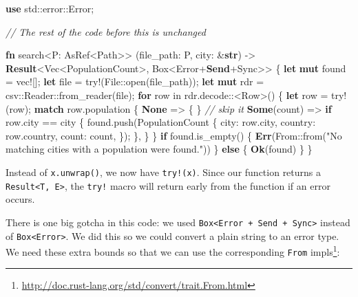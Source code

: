 \documentclass[a4paper,]{book}
\newenvironment{Shaded}{\begin{snugshade}}{\end{snugshade}}
\newcommand{\KeywordTok}[1]{\textcolor[rgb]{0.13,0.29,0.53}{\textbf{{#1}}}}
\newcommand{\StringTok}[1]{\textcolor[rgb]{0.31,0.60,0.02}{{#1}}}
\newcommand{\CommentTok}[1]{\textcolor[rgb]{0.56,0.35,0.01}{\textit{{#1}}}}
\newcommand{\OtherTok}[1]{\textcolor[rgb]{0.56,0.35,0.01}{{#1}}}
\newcommand{\NormalTok}[1]{{#1}}
\renewcommand{\href}[2]{#2\footnote{\url{#1}}}
\begin{document}
\begin{Shaded}
\begin{Highlighting}[]
\KeywordTok{use} \NormalTok{std::error::Error;}

\CommentTok{// The rest of the code before this is unchanged}

\KeywordTok{fn} \NormalTok{search<P: AsRef<Path>>}
         \NormalTok{(file_path: P, city: &}\KeywordTok{str}\NormalTok{)}
         \NormalTok{-> }\KeywordTok{Result}\NormalTok{<Vec<PopulationCount>, Box<Error+}\KeywordTok{Send}\NormalTok{+Sync>> \{}
    \KeywordTok{let} \KeywordTok{mut} \NormalTok{found = }\OtherTok{vec!}\NormalTok{[];}
    \KeywordTok{let} \NormalTok{file = }\OtherTok{try!}\NormalTok{(File::open(file_path));}
    \KeywordTok{let} \KeywordTok{mut} \NormalTok{rdr = csv::Reader::from_reader(file);}
    \KeywordTok{for} \NormalTok{row in rdr.decode::<Row>() \{}
        \KeywordTok{let} \NormalTok{row = }\OtherTok{try!}\NormalTok{(row);}
        \KeywordTok{match} \NormalTok{row.population \{}
            \KeywordTok{None} \NormalTok{=> \{ \} }\CommentTok{// skip it}
            \KeywordTok{Some}\NormalTok{(count) => }\KeywordTok{if} \NormalTok{row.city == city \{}
                \NormalTok{found.push(PopulationCount \{}
                    \NormalTok{city: row.city,}
                    \NormalTok{country: row.country,}
                    \NormalTok{count: count,}
                \NormalTok{\});}
            \NormalTok{\},}
        \NormalTok{\}}
    \NormalTok{\}}
    \KeywordTok{if} \NormalTok{found.is_empty() \{}
        \KeywordTok{Err}\NormalTok{(From::from(}\StringTok{"No matching cities with a population were found."}\NormalTok{))}
    \NormalTok{\} }\KeywordTok{else} \NormalTok{\{}
        \KeywordTok{Ok}\NormalTok{(found)}
    \NormalTok{\}}
\NormalTok{\}}
\end{Highlighting}
\end{Shaded}

Instead of \texttt{x.unwrap()}, we now have \texttt{try!(x)}. Since our
function returns a \texttt{Result\textless{}T,\ E\textgreater{}}, the
\texttt{try!} macro will return early from the function if an error
occurs.

There is one big gotcha in this code: we used
\texttt{Box\textless{}Error\ +\ Send\ +\ Sync\textgreater{}} instead of
\texttt{Box\textless{}Error\textgreater{}}. We did this so we could
convert a plain string to an error type. We need these extra bounds so
that we can use the
\href{http://doc.rust-lang.org/std/convert/trait.From.html}{corresponding
\texttt{From} impls}:
\end{document}
